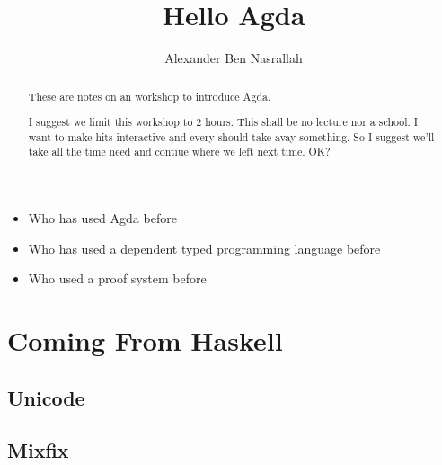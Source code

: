 \documentclass[12pt]{article}
\title{Hello Agda}
\author{Alexander Ben Nasrallah}
\begin{document}
\maketitle{}
\begin{abstract}
These are notes on an workshop to introduce Agda.

I suggest we limit this workshop to 2 hours. This shall be no lecture nor a school.
I want to make hits interactive and every should take avay something. So I suggest
we'll take all the time need and contiue where we left next time. OK?
\end{abstract}

\tableofcontents{}

\begin{itemize}
  \item Who has used Agda before
  \item Who has used a dependent typed programming language before
  \item Who used a proof system before
\end{itemize}






\section{Coming From Haskell}
\subsection{Unicode}

\subsection{Mixfix}

\printbibliography{}
\end{document}
